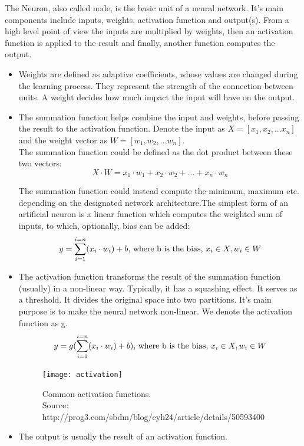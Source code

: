 The Neuron, also called node, is the basic unit of a neural network. It's main components include inputs,
weights, activation function and output(s). From a high level point of view the inputs are multiplied by 
weights, then an activation function is applied to the result and finally, another function computes the output\cite{REF:12}\cite{REF:13}. \par


\begin{itemize}
	\item Weights are defined as adaptive coefficients, whose values are changed during the learning process. They represent the strength of the connection between units. A weight decides how much impact the input will have on the output.
	
	\item The summation function helps combine the input and weights, before passing the result to the activation function. Denote the input as $X = [x_1, x_2, ...x_n]$ and the weight vector as $W = [w_1, w_2, ...w_n]$.\\
	The summation function could be defined as the dot product between these two vectors:\\
	\begin{equation}
	X \cdot W =x_1 \cdot w_1 +x_2 \cdot w_2 +...+x_n \cdot w_n
	\end{equation}

	
	The summation function could instead compute the minimum, maximum etc. depending on the designated network architecture.The simplest form of an artificial neuron is a linear function which computes the weighted sum of inputs, to which, optionally, bias can be added:
	\begin{equation}
		y = \sum_{i=1}^{i=n}(x_i \cdot w_i) + b \textnormal{, where b is the bias, $x_i \in X, w_i \in W$}
	\end{equation}

	
	\item The activation function transforms the result of the summation function (usually) in a non-linear way. Typically, it has a squashing effect. It serves as a threshold. It divides the original space into two partitions. It's main purpose is to make the neural network non-linear. We denote the activation function as g.
	\begin{equation}
		y = g(\sum_{i=1}^{i=n}(x_i \cdot w_i) + b) \textnormal{, where b is the bias, $x_i \in X, w_i \in W$}
	\end{equation}

	
	\begin{figure}[h]
		\centering
		\texttt{[image: activation]}
		\caption[Common activation functions]{Common activation functions.\\
		 	Source: http://prog3.com/sbdm/blog/cyh24/article/details/50593400 }
	\end{figure}
	\item The output is usually the result of an activation function.
	
\end{itemize}

